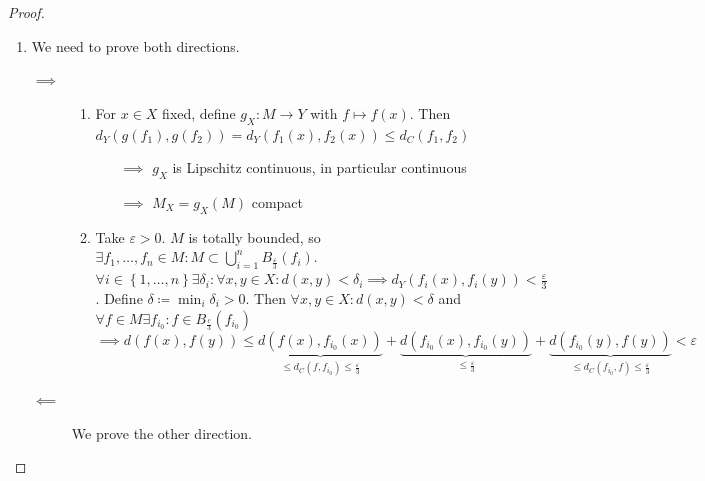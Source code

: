 \documentclass[a4paper]{article}
\numberwithin{lecref}{section}
\newcommand{\Abs}[1]{\left|#1\right|}
\newcommand{\Set}[1]{\left\{#1\right\}}
\begin{document}
\begin{proof}
\begin{enumerate}
			In general, we have $\forall x, y, z \in (Z, d_Z)$ with $d_Z$ as a metric.
			\[ \Abs{d(x, z) - d(y, z)} \leq d(x, y) \]
			\begin{proof}
				\begin{align}
					d(x, z) &\leq d(x, y) + d(y, z) \implies d(x, z) - d(y, z) \leq d(x, y) \label{a} \\
					d(y, z) &\leq d(y, x) + d(x, z) \implies d(y, z) - d(x, z) \leq d(x, y) \label{b} \\
					\eqref{a} \text{ and } \eqref{b} &\implies \Abs{d(x, z) - d(y, z)} \leq d(x, y)
				\end{align}
			\end{proof}
			Consequently, $\forall z \in Z$, $x_n \to x$ in $Z$: $d(x_n, z) \to d(x, z)$
			since $\Abs{d(x_n, z) - d(x, z)} \leq d(x_n, x) \to 0$.

		\item We need to prove both directions.

			\begin{description}
				\item[$\implies$]
					\begin{enumerate}
						\item For $x \in X$ fixed, define $g_X: M \to Y$ with $f \mapsto f(x)$.
							Then $d_Y(g(f_1), g(f_2)) = d_Y(f_1(x), f_2(x)) \leq d_C(f_1, f_2)$
							\begin{itemize}
								\item[$\implies$] $g_X$ is Lipschitz continuous, in particular continuous
								\item[$\implies$] $M_X = g_X(M)$ compact
							\end{itemize}

						\item Take $\varepsilon > 0$. $M$ is totally bounded, so $\exists f_1, \dots, f_n \in M: M \subset \bigcup_{i=1}^n B_{\frac\varepsilon3}(f_i)$.
							$\forall i \in \Set{1, \dots, n} \exists \delta_i: \forall x, y \in X: d(x, y) < \delta_i \implies d_Y(f_i(x), f_i(y)) < \frac\varepsilon3$.
							Define $\delta \coloneqq \min_i \delta_i > 0$. Then $\forall x, y \in X: d(x, y) < \delta$ and $\forall f \in M \exists f_{i_0}: f \in B_{\frac c3}(f_{i_0})$
							\[ \implies d(f(x), f(y)) \leq \underbrace{d(f(x), f_{i_0}(x))}_{\leq d_C(f, f_{i_0}) \leq \frac\varepsilon3} + \underbrace{d(f_{i_0}(x), f_{i_0}(y))}_{\leq \frac\varepsilon3} + \underbrace{d(f_{i_0}(y), f(y))}_{\leq d_C(f_{i_0}, f) \leq \frac\varepsilon3} < \varepsilon \]
					\end{enumerate}
				\item[$\impliedby$]
					We prove the other direction.


\end{description}
\end{enumerate}
\end{proof}
\end{document}
